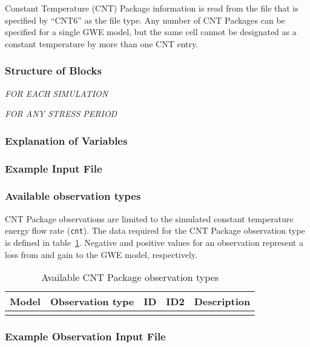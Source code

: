 Constant Temperature (CNT) Package information is read from the file that is specified by ``CNT6'' as the file type.  Any number of CNT Packages can be specified for a single GWE model, but the same cell cannot be designated as a constant temperature by more than one CNT entry. 

\vspace{5mm}
\subsubsection{Structure of Blocks}
\vspace{5mm}

\noindent \textit{FOR EACH SIMULATION}


\vspace{5mm}
\noindent \textit{FOR ANY STRESS PERIOD}

\packageperioddescription

\vspace{5mm}
\subsubsection{Explanation of Variables}
\begin{description}

\end{description}

\vspace{5mm}
\subsubsection{Example Input File}


\vspace{5mm}
\subsubsection{Available observation types}
CNT Package observations are limited to the simulated constant temperature energy flow rate (\texttt{cnt}). The data required for the CNT Package observation type is defined in table~\ref{table:gwe-cntobstype}. Negative and positive values for an observation represent a loss from and gain to the GWE model, respectively.

\begin{longtable}{p{2cm} p{2.75cm} p{2cm} p{1.25cm} p{7cm}}
\caption{Available CNT Package observation types} \tabularnewline

\hline
\hline
\textbf{Model} & \textbf{Observation type} & \textbf{ID} & \textbf{ID2} & \textbf{Description} \\
\hline
\endhead

\hline
\endfoot


\label{table:gwe-cntobstype}
\end{longtable}

\vspace{5mm}
\subsubsection{Example Observation Input File}

